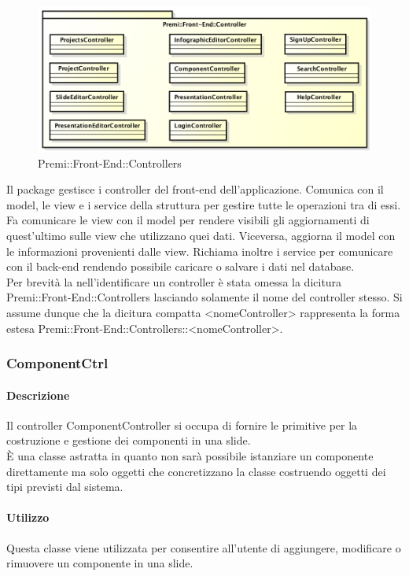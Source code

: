 \begin{figure}[h]
	\centering
	\includegraphics[width=1.0\linewidth]{img/premi_front_end_controllers}
	\caption[Premi::Front-End::Controllers]{Premi::Front-End::Controllers}
\end{figure}
Il package gestisce i controller del front-end dell'applicazione. Comunica con il model, le view e i service della struttura per gestire tutte le operazioni tra di essi. Fa comunicare le view con il model per rendere visibili gli aggiornamenti di quest'ultimo sulle view che utilizzano quei dati. Viceversa, aggiorna il model con le informazioni provenienti dalle view. Richiama inoltre i service per comunicare con il back-end rendendo possibile caricare o salvare i dati nel database.\\
Per brevità la nell'identificare un controller è stata omessa la dicitura Premi::Front-End::Controllers lasciando solamente il nome del controller stesso. Si assume dunque che la dicitura compatta <nomeController> rappresenta la forma estesa Premi::Front-End::Controllers::<nomeController>.

\newpage

\subsubsection{ComponentCtrl}
      \paragraph{Descrizione}
	Il controller ComponentController si occupa di fornire le primitive per la costruzione e gestione dei componenti in una slide.\\
	È una classe astratta in quanto non sarà possibile istanziare un componente direttamente ma solo oggetti che concretizzano la classe costruendo oggetti dei tipi previsti dal sistema.
		
	\paragraph{Utilizzo}
	Questa classe viene utilizzata per consentire all'utente di aggiungere, modificare o rimuovere un componente in una slide.
	
